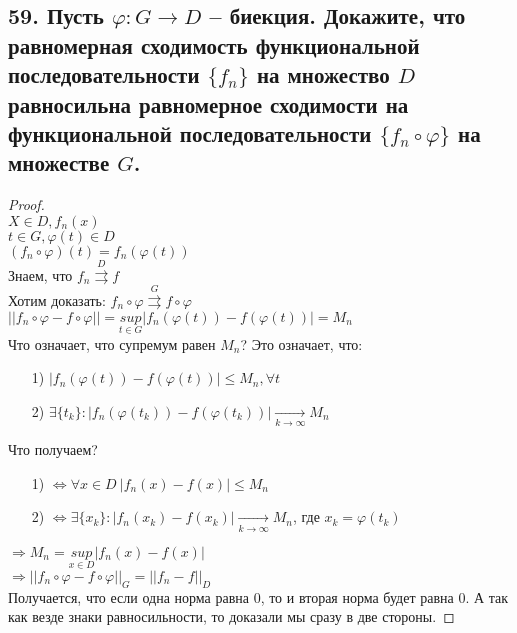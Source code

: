 \documentclass[a4paper, fleqn]{article}
\begin{document}
    \subsection*{59. Пусть $\displaystyle \varphi: G \to D$ -- биекция. Докажите, что
    равномерная сходимость функциональной последовательности $\displaystyle \{f_n\}$
    на множество $\displaystyle D$ равносильна равномерное сходимости на функциональной
    последовательности $\displaystyle \{f_n \circ \varphi\}$ на множестве $G$.
    }
    \begin{proof} \ \\
        $\displaystyle X \in D, f_n(x)$\\
        $ t \in G, \varphi(t) \in D$ \\
        $\displaystyle (f_n \circ \varphi)(t) = f_n(\varphi(t))$ \\
        Знаем, что $\displaystyle f_n \overset{D}{\rightrightarrows} f$ \\
        Хотим доказать: $\displaystyle f_n \circ \varphi \overset{G}{\rightrightarrows}
        f \circ \varphi$ \\[9.5pt]
        $\displaystyle ||f_n \circ \varphi - f \circ \varphi|| =
        \underset{t \in G}{sup} |f_n(\varphi(t)) - f(\varphi(t))| = M_n$ \\ 
        Что означает, что супремум равен $\displaystyle M_n$? Это означает, что:
        \begin{itemize}
            \item[1)] $\displaystyle |f_n(\varphi(t)) - f(\varphi(t))| \leqslant M_n, \forall t$
            \item[2)] $\displaystyle \exists \{t_k\}: |f_n(\varphi(t_k)) - f(\varphi(t_k))|
            \xrightarrow[k \to \infty]{} M_n$ 
        \end{itemize}  
        Что получаем?
        \begin{itemize}
            \item[1)] $\displaystyle \Leftrightarrow \forall x \in D \
            |f_n(x) - f(x)| \leqslant M_n$
            \item[2)] $\displaystyle \Leftrightarrow \exists \{x_k\}: 
            |f_n(x_k) - f(x_k)| \xrightarrow[k \to \infty]{} M_n$, где $\displaystyle x_k =
            \varphi(t_k)$
        \end{itemize}
        $\displaystyle \Rightarrow M_n =
        \underset{x \in D}{sup} |f_n(x) - f(x)|$ \\ 
        $\displaystyle \Rightarrow ||f_n \circ \varphi - f \circ \varphi||_G =
        ||f_n - f||_D$\\
        Получается, что если одна норма равна 0, то и вторая норма будет равна 0. А так как везде
        знаки равносильности, то доказали мы сразу в две стороны.
    \end{proof}
        
\end{document}
